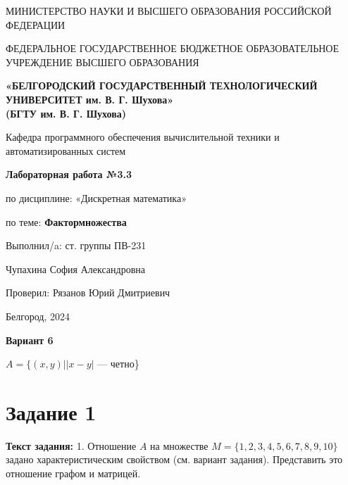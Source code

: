\documentclass[12pt]{article}
\begin{document}
	\begin{center}
		{\parskip=1cm
			МИНИСТЕРСТВО НАУКИ И ВЫСШЕГО ОБРАЗОВАНИЯ РОССИЙСКОЙ ФЕДЕРАЦИИ
			
			ФЕДЕРАЛЬНОЕ ГОСУДАРСТВЕННОЕ БЮДЖЕТНОЕ ОБРАЗОВАТЕЛЬНОЕ УЧРЕЖДЕНИЕ ВЫСШЕГО ОБРАЗОВАНИЯ
			
			{\bf«БЕЛГОРОДСКИЙ ГОСУДАРСТВЕННЫЙ ТЕХНОЛОГИЧЕСКИЙ УНИВЕРСИТЕТ им. В. Г. Шухова»\\(БГТУ им. В. Г. Шухова)}
			
			\begin{figure}[bh]
				\noindent{}
			\end{figure}
			Кафедра программного обеспечения вычислительной техники и автоматизированных систем
		}
		
		{\Large 
			\vspace{1cm}
			{\parskip=0.25cm 
				{\bf Лабораторная работа №3.3}
				
				по дисциплине: «Дискретная математика»
				
				по теме: {\bf Фактормножества}
			}
		}
	\end{center}	
	\begin{flushleft}
		{\leftskip=10cm
			{\vspace{3cm} Выполнил/a: ст. группы ПВ-231}
			
			Чупахина София Александровна
			
			Проверил: Рязанов Юрий Дмитриевич
			
		}
	\end{flushleft}
	\begin{center}
		{\parskip=3cm Белгород, 2024}
	\end{center}
	\newpage

	{\Large \bf Вариант 6}
	 
	$A=\{(x,y) \Big| |x - y|$ --- четно\} 
	
	\tableofcontents
	\newpage
	
	\section{Задание 1}
	\label{task1}
	{\bf Текст задания:} 1. Отношение $A$ на множестве $M = \{1,2,3,4,5,6,7,8,9,10\}$ задано характеристическим свойством (см. вариант задания). Представить это отношение графом и матрицей.  
	
\end{document}
